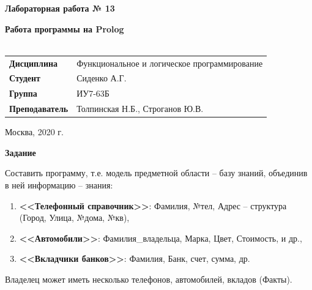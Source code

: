 \documentclass[a4paper,14pt]{extreport} %
\begin{document}
\begin{titlepage}
    \vspace{4cm}

    \begin{center}
        \textbf{Лабораторная работа № 13} \\ 
        \hfill
        
        \textbf{Работа программы на Prolog} \\
        \vspace{0.5cm}
        \textbf{} \\
    \end{center}

    \vspace{4cm}

    \begin{flushleft}
        \begin{tabular}{ll}
            \textbf{Дисциплина} & Функциональное и логическое программирование \\
            \textbf{Студент} & Сиденко А.Г. \\
            \textbf{Группа} & ИУ7-63Б \\
            \textbf{Преподаватель} & Толпинская Н.Б., Строганов Ю.В.  \\
        \end{tabular}
    \end{flushleft}

    \vspace{4cm}

   \begin{center}
        Москва, 2020 г.
    \end{center}

\end{titlepage}

\textbf{Задание}

Составить программу, т.е. модель предметной области – базу знаний, объединив в ней информацию – знания:

\begin{enumerate}
\item \textbf{<<Телефонный справочник>>}: Фамилия, №тел, Адрес – структура (Город, Улица, №дома, №кв),
\item \textbf{<<Автомобили>>}: Фамилия\_владельца, Марка, Цвет, Стоимость, и др.,
\item \textbf{<<Вкладчики банков>>}: Фамилия, Банк, счет, сумма, др.
\end{enumerate}

Владелец может иметь несколько телефонов, автомобилей, вкладов (Факты).
\end{document}
